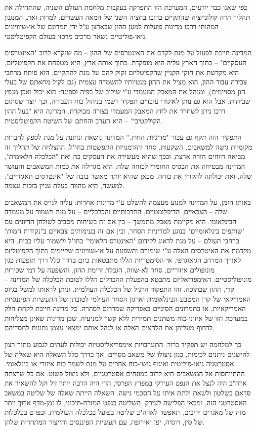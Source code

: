 כפי שאנו כבר יודעים, המערכת הזו התפרקה בעקבות מלחמת העולם השניה, שהתחילה את תהליך הדה-קולוניזציה שהתקיים ברובו בחציה השני של המאה העשרים. למרות זאת, המנגנון המהותי דרכו מדינות פועלות למען ההון שבארצן ע"ל ידי תמרונם של אי-שיוויונים גיאו-פוליטיים נשאר מרכיב מרכזי בעולם הקפיטליסטי.

המדינה חייבת לפעול על מנת לקדם את האינטרסים של ההון – מה שנקרא לרוב "האינטרסים העסקיים" – בתוך הארץ עליה היא מופקדת. בתוך אותה ארץ, היא מטפחת את הקפיטליזם, היא מקדשת את חוקי הקניין שהקפיטליזם זקוק להם על מנת להתקיים, הוא פותח מרחבי צבירה עבור ההון, הוא מציל את ההון מנטיותיו להשמדה עצמית (גם לקול מחאתם של בעלי הון מסויימים), ומנהל את המאבק המעמדי ע"י שילוב של כפיה וספיגה: הוא יכול ואכן מנפץ שביתות, אבל הוא גם נותן לאיגודי עובדים תפקיד רשמי בניהול כוח-העבודה, וכך יוצר שסתום דרכו ניתן לשחרר את לחץ המאבק המעמדי בצורה מבוקרת. המדינה היא "בעל ההון הקולקטיבי" – היא הערב והחתם של השיטה הקפיטליסטית.

התפקיד הזה תקף גם עבור "מדיניות החוץ.” המדינה נושאת ונותנת על מנת לספק לחברות מקומיות גישה למשאבים, השקעות, סחר והזדמנויות התפשטות בחו"ל. ההצלחה של תהליך זה מביאה רווחים חזרה ארצה, ובכך שהיא מעשירה את העסקים בה ואת "הכלכלה הלאומית", המדינה מבטיחה את הבסיס החומרי לכוחה שלה: היא מגדילה את כמות המשאבים והעושר שלה, ואת יכולתה להקרין את כוחה. מכאן שהיא יותר מאשר בובה של "אינטרסים תאגידיים": למעשה, היא מהווה בעלת עניין בזכות עצמה.

באותו הזמן, על המדינה למנוע מעצמה להשלט ע"י מדינות אחרות: עליה לגייס את המשאבים שלה – הצבאיים, הדיפלומטיים, התרבותיים והכלכליים – על מנת לשמור על מעמדה הבינלאומי. היא מקיימת מאבק מתמשך – בין אם זה בשיחות מסביב לשולחן הדיונים עם "שותפים בינלאומיים" בנוגע למדיניות הסחר, ובין אם זה בעימותים צבאיים ב"נקודות חמות" ברחבי העולם – על מנת לדאוג לקידום "האינטרס הלאומי" בחו"ל ולשמור עליו בבית. היא מקדמת את האיטרסים האלה ע"י שימורם והשפעה על אי-שוויונים שקיימים בתוך הקפיטליזם לאורך המרחב הגיאוגרפי. אי-הסימטריות הללו מתבטאות כיום בדרך כלל דרך תופעות כגון מונופולים איזוריים, סחר לא-שווה, הגבלת זרימת ההון, והשפעה על דמי שכירות מונופוליסטיים. האימפריאליזם מתבטא בהפעלת ההבדלים הללו לטובת הכלכלה של המדינה – קרי, ההון שבתוכה. זהו התפקוד הרגיל של הכלכלה העולמית, וניתן לראותו למשל בגיוס האמריקאי של קרן המטבע הבינלאומית וארגון הסחר העולמי לטובתן של התעשיות הפיננסיות האמריקאיות, או בתמרונים הסיניים באפריקה שמדרום לסהרה. כל מדינה חייבת לקחת חלק במערכת הזו של איזוני-כוח משתנים תמידית ללא  קשר למניעיה, שכן מדינות שאינן מצליחות לדחוף מעליהן את הלחצים האלה או לנהל אותם ימצאו עצמן נתונות לחסדיהם.

כך למלחמה יש תפקיד ברור. התערבויות אימפריאליסטיות יכולות לעתים לנבוע מתוך רצון להישגים ניתנים לכימות, כגון ניצולו של משאב מסויים. אך בדרך כלל השאלה היא שאלה של אסטרטגיה גיאו-פוליטית ואיגוף גושי-כוח אחרים על מנת לשמר כוח איזורי או בינלאומי. ההתייחסות אל המשאבים היא לרוב במונחים אסטרטגיים, ולא ניצול פשוט. אם כל שרצתה ארה"ב היה לנצל את הנפט העירקי במפרץ הפרסי, הרי היה הרבה יותר זול וקל להשאיר את סדאם בשלטון ולשאת ולתת איתו על הסכמי גישה. השאלה הייתה שאלה של שליטה במשאב האסטרטגי הזה, ומכאן הפלישה לעירק. השליטה בנפט המזרח-תיכוני, לו זמן-מדף ארוך יותר מזה של מאגרים יריבים, תאפשר לארה"ב שליטה בפועל בכלכלה העולמית, ובפרט בכלכלות של סין, רוסיה, יפן ואירופה, עם תעשיות הפיננסים והייצור המתחרות שלהן.

